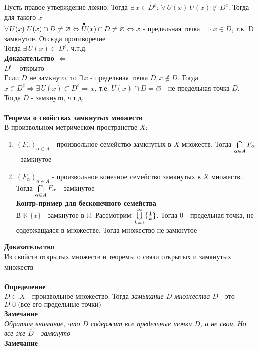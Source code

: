 \documentclass[12pt]{article}
\begin{document}
Пусть правое утверждение ложно. Тогда $\exists\,x\in D^c:\ \forall\,U(x)\ U(x)\not\subset D^c$. Тогда для такого $x$\\
$\forall\,U(x)\ U(x)\cap D \neq\varnothing \Leftrightarrow \overset{\bullet}{U}(x)\cap D \neq \varnothing \Leftrightarrow x$ - предельная точка $\Rightarrow x\in D$, т.к. D замкнутое. Отсюда противоречие\\
Тогда $\exists\,U(x) \subset D^c$, ч.т.д.\\
\textbf{Доказательство $\Leftarrow$}\\
$D^c$ - открыто\\
Если $D$ не замкнуто, то $\exists\,x$ - предельная точка $D, x\notin D$. Тогда $x\in D^c \Rightarrow \exists\, U(x)\subset D^c \Rightarrow x$, т.е. $U(x) \cap D = \varnothing$ - не предельная точка $D$. Тогда $D$ - замкнуто, ч.т.д.\\\\
\textbf{Теорема о свойствах замкнутых множеств}\\
В произвольном метрическом пространстве $X$:
\begin{enumerate}
    \item $(F_\alpha)_{\alpha \in A}$ - произвольное семейство замкнутых в $X$ множеств. Тогда $\bigcap\limits_{\alpha \in A} F_\alpha$ - замкнутое
    \item $(F_\alpha)_{\alpha \in A}$ - произвольное конечное семейство замкнутых в $X$ множеств. Тогда $\bigcap\limits_{\alpha \in A} F_\alpha$ - замкнутое\\
    \textbf{Контр-пример для бесконечного семейства}\\
    В $\mathbb{R}$ $\{x\}$ - замкнутое в $\mathbb{R}$. Рассмотрим $\bigcup\limits_{k=1}^\infty \{\frac 1k\}$. Тогда $0$ - предельная точка, не содержащаяся в множестве. Тогда множество не замкнутое
\end{enumerate}
\textbf{Доказательство}\\
Из свойств открытых множеств и теоремы о связи открытых и замкнутых множеств\\\\
\textbf{Определение}\\
$D\subset X$ - произвольное множество. Тогда \textit{замыкание $\overline{D}$ множества $D$} - это $D\cup\text{(все его предельные точки)}$\\
\textbf{Замечание}\\
\textit{Обратим внимание, что $\overline{D}$ содержит все предельные точки $D$, а не свои. Но все же $\overline{D}$ - замкнуто}\\
\textbf{Замечание}
\end{document}
